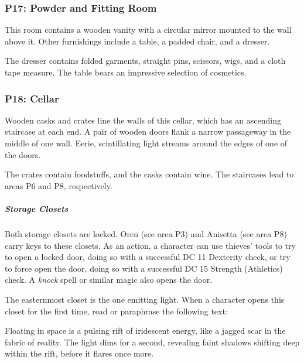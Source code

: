 \documentclass[10pt,a4paper,twoside,bg=print,twocolumn,openany,nodeprecatedcode]{dndbook}
\begin{document}
\subsubsection{P17: Powder and Fitting Room}
\begin{DndReadAloud}{}
This room contains a wooden vanity with a circular mirror mounted to the wall above it. Other furnishings include a table, a padded chair, and a dresser.

\end{DndReadAloud}

The dresser contains folded garments, straight pins, scissors, wigs, and a cloth tape measure. The table bears an impressive selection of cosmetics.

\subsubsection{P18: Cellar}
\begin{DndReadAloud}{}
Wooden casks and crates line the walls of this cellar, which has an ascending staircase at each end. A pair of wooden doors flank a narrow passageway in the middle of one wall. Eerie, scintillating light streams around the edges of one of the doors.

\end{DndReadAloud}

The crates contain foodstuffs, and the casks contain wine. The staircases lead to areas P6 and P8, respectively.

\subparagraph{Storage Closets}
Both storage closets are locked. Oren (see area P3) and Anisetta (see area P8) carry keys to these closets. As an action, a character can use thieves' tools to try to open a locked door, doing so with a successful DC 11 Dexterity check, or try to force open the door, doing so with a successful DC 15 Strength (Athletics) check. A \textit{knock} spell or similar magic also opens the door.

The easternmost closet is the one emitting light. When a character opens this closet for the first time, read or paraphrase the following text:

\begin{DndReadAloud}{}
Floating in space is a pulsing rift of iridescent energy, like a jagged scar in the fabric of reality. The light dims for a second, revealing faint shadows shifting deep within the rift, before it flares once more.

\end{DndReadAloud}
\end{document}
